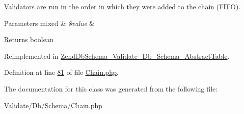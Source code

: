 Validators are run in the order in which they were added to the chain (F\-I\-F\-O).


\begin{DoxyParams}[1]{Parameters}
mixed & {\em \$value} & \\
\hline
\end{DoxyParams}
\begin{DoxyReturn}{Returns}
boolean 
\end{DoxyReturn}


Reimplemented in \hyperlink{classZendDbSchema__Validate__Db__Schema__AbstractTable_a09568c231bbb25d353f1a95ecc42146a}{Zend\-Db\-Schema\-\_\-\-Validate\-\_\-\-Db\-\_\-\-Schema\-\_\-\-Abstract\-Table}.



Definition at line \hyperlink{Chain_8php_source_l00081}{81} of file \hyperlink{Chain_8php_source}{Chain.\-php}.



The documentation for this class was generated from the following file\-:\begin{DoxyCompactItemize}
\item 
Validate/\-Db/\-Schema/Chain.\-php\end{DoxyCompactItemize}
